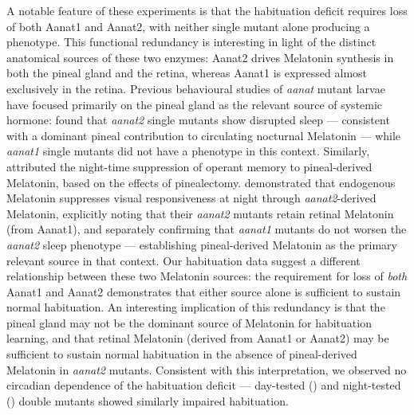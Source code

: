 \documentclass[9.5pt]{RandlettLab_elife}            %
\begin{document}
A notable feature of these experiments is that the habituation deficit requires loss of both Aanat1 and Aanat2, with neither single mutant alone producing a phenotype.
This functional redundancy is interesting in light of the distinct anatomical sources of these two enzymes: Aanat2 drives Melatonin synthesis in both the pineal gland and the retina, whereas Aanat1 is expressed almost exclusively in the retina.
Previous behavioural studies of \emph{aanat} mutant larvae have focused primarily on the pineal gland as the relevant source of systemic hormone: \citet{Gandhi2015_NEURON} found that \emph{aanat2} single mutants show disrupted sleep — consistent with a dominant pineal contribution to circulating nocturnal Melatonin — while \emph{aanat1} single mutants did not have a phenotype in this context.
Similarly, \citet{Rawashdeh2007-bw} attributed the night-time suppression of operant memory to pineal-derived Melatonin, based on the effects of pinealectomy.
\citet{Hill2026} demonstrated that endogenous Melatonin suppresses visual responsiveness at night through \emph{aanat2}-derived Melatonin, explicitly noting that their \emph{aanat2} mutants retain retinal Melatonin (from Aanat1), and separately confirming that \emph{aanat1} mutants do not worsen the \emph{aanat2} sleep phenotype — establishing pineal-derived Melatonin as the primary relevant source in that context.
Our habituation data suggest a different relationship between these two Melatonin sources: the requirement for loss of \emph{both} Aanat1 and Aanat2 demonstrates that either source alone is sufficient to sustain normal habituation.
An interesting implication of this redundancy is that the pineal gland may not be the dominant source of Melatonin for habituation learning, and that retinal Melatonin (derived from Aanat1 or Aanat2) may be sufficient to sustain normal habituation in the absence of pineal-derived Melatonin in \emph{aanat2} mutants.
Consistent with this interpretation, we observed no circadian dependence of the habituation deficit — day-tested () and night-tested () double mutants showed similarly impaired habituation. 
\end{document}
